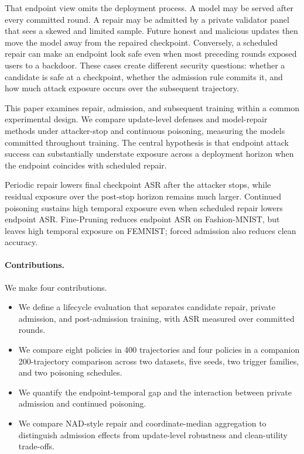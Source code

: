 \documentclass[sigconf,review,anonymous]{acmart}
\begin{document}
That endpoint view omits the deployment process. A model may be served after every committed round. A repair may be admitted by a private validator panel that sees a skewed and limited sample. Future honest and malicious updates then move the model away from the repaired checkpoint. Conversely, a scheduled repair can make an endpoint look safe even when most preceding rounds exposed users to a backdoor. These cases create different security questions: whether a candidate is safe at a checkpoint, whether the admission rule commits it, and how much attack exposure occurs over the subsequent trajectory.

This paper examines repair, admission, and subsequent training within a common experimental design. We compare update-level defenses and model-repair methods under attacker-stop and continuous poisoning, measuring the models committed throughout training. The central hypothesis is that endpoint attack success can substantially understate exposure across a deployment horizon when the endpoint coincides with scheduled repair.

Periodic repair lowers final checkpoint ASR after the attacker stops, while residual exposure over the post-stop horizon remains much larger. Continued poisoning sustains high temporal exposure even when scheduled repair lowers endpoint ASR. Fine-Pruning reduces endpoint ASR on Fashion-MNIST, but leaves high temporal exposure on FEMNIST; forced admission also reduces clean accuracy.

\paragraph{Contributions.} We make four contributions.
\begin{itemize}
\item We define a lifecycle evaluation that separates candidate repair, private admission, and post-admission training, with ASR measured over committed rounds.
\item We compare eight policies in 400 trajectories and four policies in a companion 200-trajectory comparison across two datasets, five seeds, two trigger families, and two poisoning schedules.
\item We quantify the endpoint-temporal gap and the interaction between private admission and continued poisoning.
\item We compare NAD-style repair and coordinate-median aggregation to distinguish admission effects from update-level robustness and clean-utility trade-offs.
\end{itemize}
\end{document}
